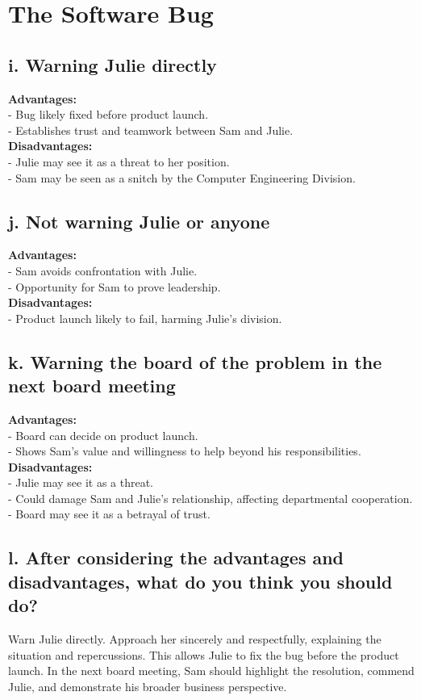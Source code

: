 \documentclass{article}
\begin{document}
\pagebreak
\section{The Software Bug}

\subsection{i. Warning Julie directly}
\textbf{Advantages:} \\
- Bug likely fixed before product launch. \\
- Establishes trust and teamwork between Sam and Julie. \\

\textbf{Disadvantages:} \\
- Julie may see it as a threat to her position. \\
- Sam may be seen as a snitch by the Computer Engineering Division. \\

\subsection{j. Not warning Julie or anyone}
\textbf{Advantages:} \\
- Sam avoids confrontation with Julie. \\
- Opportunity for Sam to prove leadership. \\

\textbf{Disadvantages:} \\
- Product launch likely to fail, harming Julie's division. \\

\subsection{k. Warning the board of the problem in the next board meeting}
\textbf{Advantages:} \\
- Board can decide on product launch. \\
- Shows Sam's value and willingness to help beyond his responsibilities. \\

\textbf{Disadvantages:} \\
- Julie may see it as a threat. \\
- Could damage Sam and Julie's relationship, affecting departmental cooperation. \\
- Board may see it as a betrayal of trust. \\

\subsection{l. After considering the advantages and disadvantages, what do you think you should do?}
Warn Julie directly. Approach her sincerely and respectfully, explaining the situation and repercussions. This allows Julie to fix the bug before the product launch. In the next board meeting, Sam should highlight the resolution, commend Julie, and demonstrate his broader business perspective.
\end{document}
